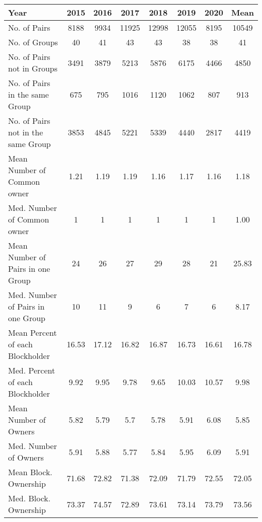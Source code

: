 \begin{tabular}{lccccccc}
\hline\hline
    Year  & 2015  & 2016  & 2017  & 2018  & 2019  & 2020  & Mean \\
    \hline    No. of Pairs & 8188  & 9934  & 11925 & 12998 & 12055 & 8195  & 10549 \\
    No. of Groups & 40    & 41    & 43    & 43    & 38    & 38    & 41 \\
    No. of Pairs not in Groups & 3491  & 3879  & 5213  & 5876  & 6175  & 4466  & 4850 \\
    No. of Pairs in the same Group & 675   & 795   & 1016  & 1120  & 1062  & 807   & 913 \\
    No. of Pairs not in the same Group & 3853  & 4845  & 5221  & 5339  & 4440  & 2817  & 4419 \\
    Mean Number of Common owner & 1.21  & 1.19  & 1.19  & 1.16  & 1.17  & 1.16  & 1.18 \\
    Med. Number of Common owner & 1     & 1     & 1     & 1     & 1     & 1     & 1.00 \\
    Mean Number of Pairs in one Group & 24    & 26    & 27    & 29    & 28    & 21    & 25.83 \\
    Med. Number of Pairs in one Group & 10    & 11    & 9     & 6     & 7     & 6     & 8.17 \\
    Mean  Percent of each Blockholder & 16.53 & 17.12 & 16.82 & 16.87 & 16.73 & 16.61 & 16.78 \\
    Med. Percent of each Blockholder & 9.92  & 9.95  & 9.78  & 9.65  & 10.03 & 10.57 & 9.98 \\
    Mean Number of Owners & 5.82  & 5.79  & 5.7   & 5.78  & 5.91  & 6.08  & 5.85 \\
    Med. Number of Owners & 5.91  & 5.88  & 5.77  & 5.84  & 5.95  & 6.09  & 5.91 \\
    Mean Block. Ownership & 71.68 & 72.82 & 71.38 & 72.09 & 71.79 & 72.55 & 72.05 \\
    Med. Block. Ownership & 73.37 & 74.57 & 72.89 & 73.61 & 73.14 & 73.79 & 73.56 \\
    
    \hline\hline
   \end{tabular}
         